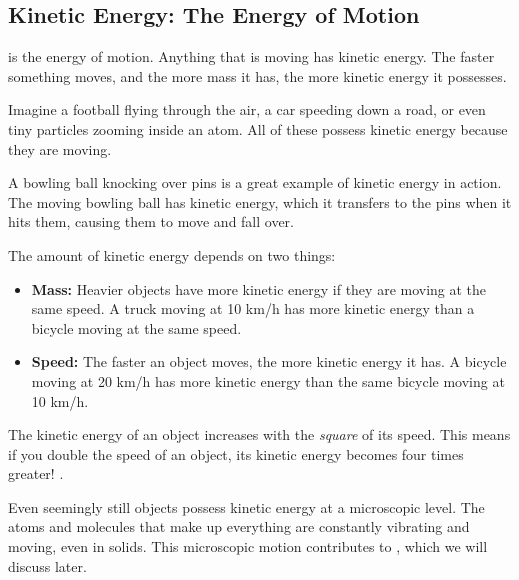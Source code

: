 \subsection{Kinetic Energy: The Energy of Motion}

 is the energy of motion.  Anything that is moving has kinetic energy. The faster something moves, and the more mass it has, the more kinetic energy it possesses.


Imagine a football flying through the air, a car speeding down a road, or even tiny particles zooming inside an atom.  All of these possess kinetic energy because they are moving.

\begin{example}
A bowling ball knocking over pins is a great example of kinetic energy in action. The moving bowling ball has kinetic energy, which it transfers to the pins when it hits them, causing them to move and fall over.
\end{example}

The amount of kinetic energy depends on two things:

\begin{itemize}
    \item \textbf{Mass:}  Heavier objects have more kinetic energy if they are moving at the same speed.  A truck moving at 10 km/h has more kinetic energy than a bicycle moving at the same speed.
    \item \textbf{Speed:} The faster an object moves, the more kinetic energy it has.  A bicycle moving at 20 km/h has more kinetic energy than the same bicycle moving at 10 km/h.
\end{itemize}

\begin{marginnote}
The kinetic energy of an object increases with the \textit{square} of its speed.  This means if you double the speed of an object, its kinetic energy becomes four times greater!  .
\end{marginnote}

Even seemingly still objects possess kinetic energy at a microscopic level. The atoms and molecules that make up everything are constantly vibrating and moving, even in solids. This microscopic motion contributes to , which we will discuss later.

